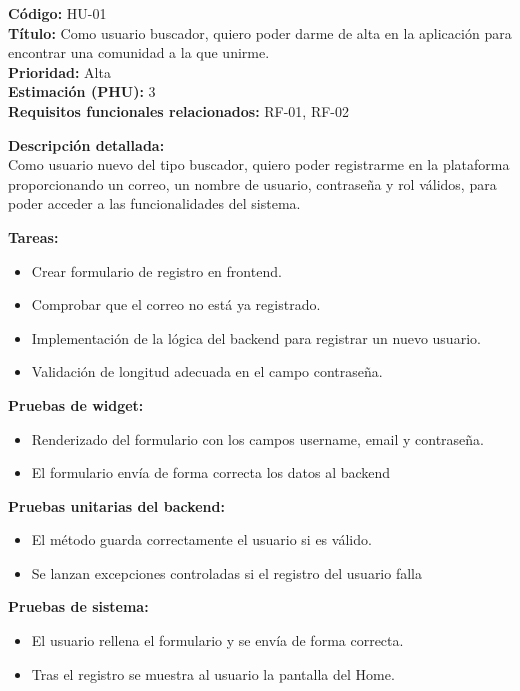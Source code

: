\begin{tarjetaHU}
\textbf{Código:} HU-01 \\
\textbf{Título:} Como usuario buscador, quiero poder darme de alta en la aplicación para encontrar una comunidad a la que unirme. \\
\textbf{Prioridad:} Alta \\
\textbf{Estimación (PHU):} 3 \\
\textbf{Requisitos funcionales relacionados:} RF-01, RF-02

\vspace{0.5em}
\textbf{Descripción detallada:} \\
Como usuario nuevo del tipo buscador, quiero poder registrarme en la plataforma proporcionando un correo, un nombre de usuario, contraseña y rol válidos, para poder acceder a las funcionalidades del sistema.

\vspace{0.5em}
\textbf{Tareas:}
\begin{itemize}[left=0pt]
  \item Crear formulario de registro en frontend.
  \item Comprobar que el correo no está ya registrado.
  \item Implementación de la lógica del backend para registrar un nuevo usuario.
  \item Validación de longitud adecuada en el campo contraseña.
\end{itemize}

\vspace{0.5em}
\textbf{Pruebas de widget:}
\begin{itemize}[left=0pt]
  \item Renderizado del formulario con los campos username, email y contraseña.
  \item El formulario envía de forma correcta los datos al backend
\end{itemize}
\textbf{Pruebas unitarias del backend:}
\begin{itemize}[left=0pt]
  \item El método guarda correctamente el usuario si es válido.
  \item Se lanzan excepciones controladas si el registro del usuario falla
\end{itemize}
\textbf{Pruebas de sistema:}
\begin{itemize}[left=0pt]
  \item El usuario rellena el formulario y se envía de forma correcta.
  \item Tras el registro se muestra al usuario la pantalla del Home.
\end{itemize}

\end{tarjetaHU}

